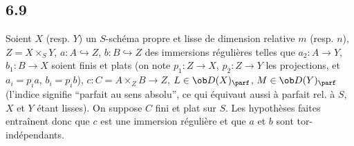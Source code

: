 \subsection*{6.9}

Soient $X$ (resp. $Y$) un $S$-schéma propre et lisse de dimension relative $m$ (resp. $n$), $Z=X\times_S Y$, $a:A\hookrightarrow Z$, $b:B\hookrightarrow Z$ des immersions régulières telles que $a_2:A\to Y$, $b_1:B\to X$ soient finis et plats (on note $p_1:Z\to X$, $p_2:Z\to Y$ les projections, et $a_i=p_i a$, $b_i=p_i b$), $c:C=A\times_Z B\to Z$, $L\in\ob D(X)_{\parf}$, $M\in\ob D(Y)_{\parf}$ (l'indice  signifie ``parfait au sens absolu'', ce qui équivaut aussi à parfait rel. à $S$, $X$ et $Y$ étant lisses). On suppose $C$ fini et plat sur $S$. Les hypothèses faites entraînent donc que $c$ est une immersion régulière et que $a$ et $b$ sont tor-indépendants.

